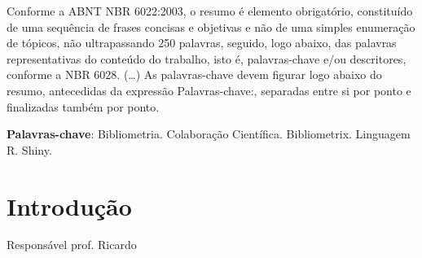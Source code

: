 \documentclass[
	article,			%
	11pt,				%
	oneside,			%
	a4paper,			%
	english,			%
	brazil,				%
	sumario=tradicional
	]{abntex2}
\begin{document}

\frenchspacing


%
%
\maketitle

\begin{resumoumacoluna}
 Conforme a ABNT NBR 6022:2003, o resumo é elemento obrigatório, constituído de
 uma sequência de frases concisas e objetivas e não de uma simples enumeração
 de tópicos, não ultrapassando 250 palavras, seguido, logo abaixo, das palavras
 representativas do conteúdo do trabalho, isto é, palavras-chave e/ou
 descritores, conforme a NBR 6028. (\ldots) As palavras-chave devem figurar logo
 abaixo do resumo, antecedidas da expressão Palavras-chave:, separadas entre si por
 ponto e finalizadas também por ponto.

 \vspace{\onelineskip}

 \noindent
 \textbf{Palavras-chave}: Bibliometria. Colaboração Científica. Bibliometrix. Linguagem R. Shiny.
\end{resumoumacoluna}


\textual

\section*{Introdução}
Responsável prof. Ricardo

\end{document}
